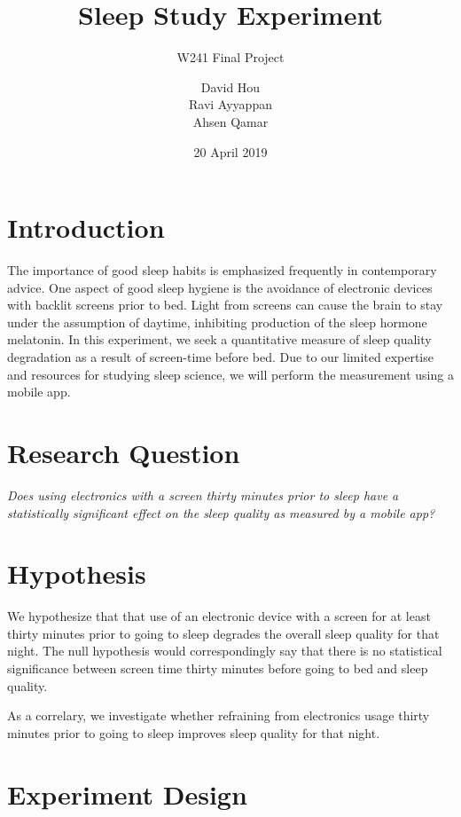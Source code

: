 \documentclass[12pt,]{article}
\title{Sleep Study Experiment}
\subtitle{W241 Final Project}
\author{David Hou \\ Ravi Ayyappan \\ Ahsen Qamar}
\date{20 April 2019}
\begin{document}
\maketitle

\hypertarget{introduction}{%
\section{Introduction}\label{introduction}}

The importance of good sleep habits is emphasized frequently in
contemporary advice. One aspect of good sleep hygiene is the avoidance
of electronic devices with backlit screens prior to bed. Light from
screens can cause the brain to stay under the assumption of daytime,
inhibiting production of the sleep hormone melatonin. In this
experiment, we seek a quantitative measure of sleep quality degradation
as a result of screen-time before bed. Due to our limited expertise and
resources for studying sleep science, we will perform the measurement
using a mobile app.

\hypertarget{research-question}{%
\section{Research Question}\label{research-question}}

\emph{Does using electronics with a screen thirty minutes prior to sleep
have a statistically significant effect on the sleep quality as measured
by a mobile app?}

\hypertarget{hypothesis}{%
\section{Hypothesis}\label{hypothesis}}

We hypothesize that that use of an electronic device with a screen for
at least thirty minutes prior to going to sleep degrades the overall
sleep quality for that night. The null hypothesis would correspondingly
say that there is no statistical significance between screen time thirty
minutes before going to bed and sleep quality.

As a correlary, we investigate whether refraining from electronics usage
thirty minutes prior to going to sleep improves sleep quality for that
night.

\hypertarget{experiment-design}{%
\section{Experiment Design}\label{experiment-design}}
\end{document}
